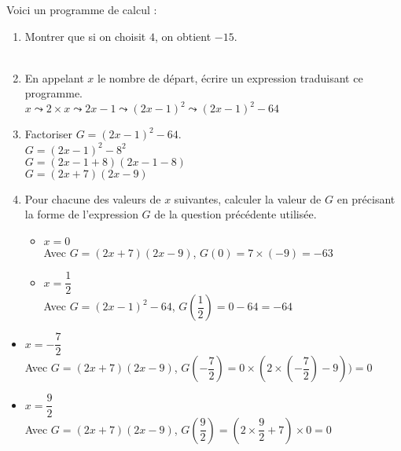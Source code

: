 \begin{corrige}
    Voici un programme de calcul :
    \begin{enumerate}
        \item Montrer que si on choisit $4$, on obtient $-15$.\\        
        \hspace*{-5mm}{\red $4 \leadsto 2\times 4=8 \leadsto 8-1=7 \leadsto 7^2=49 \leadsto 49-64=-15$}\\
        \item En appelant $x$ le nombre de départ, écrire un expression traduisant ce programme.\\
        {\red $x \leadsto 2\times x \leadsto 2x-1 \leadsto (2x-1)^2 \leadsto (2x-1)^2-64$}\\
        \item Factoriser $G = (2x-1)^2-64$.\\
        {\red $G=(2x-1)^2 - 8^2$\\$G=(2x-1+8)(2x-1-8)$\\$G=(2x+7)(2x-9)$}\\
        \item Pour chacune des valeurs de $x$ suivantes, calculer la valeur de $G$ en précisant la forme de l'expression $G$ de la question précédente utilisée.
        \begin{itemize}
            \item $x=0$\\
            {\red Avec $G=(2x+7)(2x-9)$, $G(0)=7\times (-9)=-63$}\\
            \item $x=\dfrac12$\\
            {\red Avec $G=(2x-1)^2-64$, $G(\dfrac12)=0-64=-64$}\\
        \end{itemize}
    \end{enumerate}
    \Coupe
    \begin{enumerate}        
        \begin{itemize}
            \item $x=-\dfrac72$\\
            {\red Avec $G=(2x+7)(2x-9)$, $G(-\dfrac72)=0\times (2\times(-\dfrac72) -9))=0$}\\
            \item $x=\dfrac92$\\
            {\red Avec $G=(2x+7)(2x-9)$, $G(\dfrac92)=(2\times \dfrac92 + 7)\times 0=0$}\\            
        \end{itemize}
    \end{enumerate}
\end{corrige}

